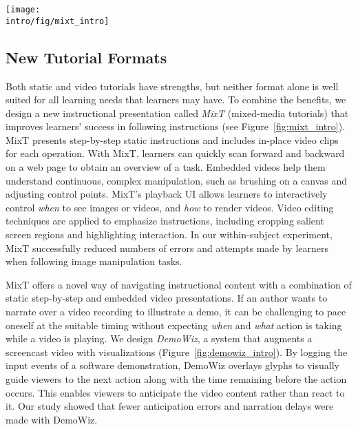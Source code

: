 
\begin{figure*}[b!]
  \centering
  \texttt{[image: \\intro/fig/mixt\_intro]}
  \caption{MixT generates step-by-step tutorials (left) that contain static and video information from task demonstrations. Videos are automatically edited and offer different views (right) to highlight the most relevant screen areas for a step. Visualizing mouse movement helps learners understand a complex action.}
  \label{fig:mixt_intro}
\end{figure*}

\subsection{New Tutorial Formats}

Both static and video tutorials have strengths, but neither format alone is well suited for all learning needs that learners may have.
%
To combine the benefits, we design a new instructional presentation called \emph{MixT} (mixed-media tutorials) that improves learners' success in following instructions (see Figure~\ref{fig:mixt_intro}).
%
MixT presents step-by-step static instructions and includes in-place video clips for each operation.
%
With MixT, learners can quickly scan forward and backward on a web page to obtain an overview of a task. Embedded videos help them understand continuous, complex manipulation, such as brushing on a canvas and adjusting control points.
%
MixT's playback UI allows learners to interactively control \emph{when} to see images or videos, and \emph{how} to render videos.
%
Video editing techniques are applied to emphasize instructions, including cropping salient screen regions and highlighting interaction.
%
In our within-subject experiment, MixT successfully reduced numbers of errors and attempts made by learners when following image manipulation tasks.

MixT offers a novel way of navigating instructional content with a combination of static step-by-step and embedded video presentations. If an author wants to narrate over a video recording to illustrate a demo, it can be challenging to pace oneself at the suitable timing without expecting \emph{when} and \emph{what} action is taking while a video is playing.
%
We design \emph{DemoWiz}, a system that augments a screencast video with visualizations (Figure~\ref{fig:demowiz_intro}). By logging the input events of a software demonstration, DemoWiz overlays glyphs to visually guide viewers to the next action along with the time remaining before the action occurs. This enables viewers to anticipate the video content rather than react to it.
%
Our study showed that fewer anticipation errors and narration delays were made with DemoWiz.

